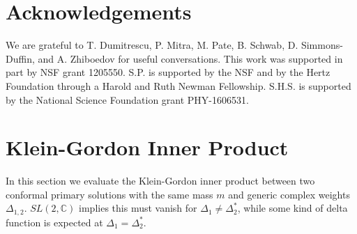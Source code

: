 \documentclass[12pt]{article}
\numberwithin{equation}{section}
\begin{document}
\section*{Acknowledgements}
We are  grateful to  T. Dumitrescu, P. Mitra, M. Pate, B. Schwab, D. Simmons-Duffin, and A. Zhiboedov for useful conversations.   This work was supported in part by NSF grant 1205550.  S.P. is supported by the NSF and by the Hertz Foundation through a Harold and Ruth Newman Fellowship.   S.H.S. is supported by the National
Science Foundation grant PHY-1606531.

\appendix
\section{Klein-Gordon Inner Product}\label{sec:KG}
In this section we evaluate the Klein-Gordon inner product between two conformal primary solutions with the same mass $m$ and generic complex weights  $\Delta_{1,2}$.  $SL(2,\mathbb{C})$ implies this must vanish for $\Delta_1\neq \Delta_2^*$, while some kind of delta function is expected at $\Delta_1=\Delta_2^*$. 
\end{document}
